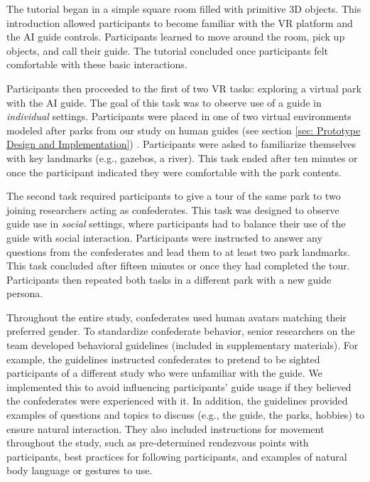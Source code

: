 

The tutorial began in a simple square room filled with primitive 3D objects. This introduction allowed participants to become familiar with the VR platform and the AI guide controls. Participants learned to move around the room, pick up objects, and call their guide. The tutorial concluded once participants felt comfortable with these basic interactions.

Participants then proceeded to the first of two VR tasks: exploring a virtual park with the AI guide. The goal of this task was to observe use of a guide in \textit{individual} settings. Participants were placed in one of two virtual environments modeled after parks from our study on human guides (see section \ref{sec: Prototype Design and Implementation}) \cite{collins2023guide}. Participants were asked to familiarize themselves with key landmarks (e.g., gazebos, a river). This task ended after ten minutes or once the participant indicated they were comfortable with the park contents.

The second task required participants to give a tour of the same park to two joining researchers acting as confederates. This task was designed to observe guide use in \textit{social} settings, where participants had to balance their use of the guide with social interaction. Participants were instructed to answer any questions from the confederates and lead them to at least two park landmarks. This task concluded after fifteen minutes or once they had completed the tour. Participants then repeated both tasks in a different park with a new guide persona.

Throughout the entire study, confederates used human avatars matching their preferred gender. To standardize confederate behavior, senior researchers on the team developed behavioral guidelines (included in supplementary materials). For example, the guidelines instructed confederates to pretend to be sighted participants of a different study who were unfamiliar with the guide. We implemented this to avoid influencing participants’ guide usage if they believed the confederates were experienced with it. In addition, the guidelines provided examples of questions and topics to discuss (e.g., the guide, the parks, hobbies) to ensure natural interaction. They also included instructions for movement throughout the study, such as pre-determined rendezvous points with participants, best practices for following participants, and examples of natural body language or gestures to use.

